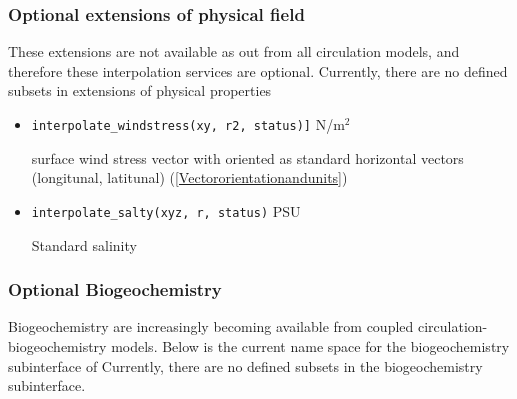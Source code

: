 \subsubsection{Optional extensions of physical field }   
 
These extensions are not available as out from all circulation models, and therefore
these interpolation services are optional. Currently, there are no defined subsets in extensions
of physical properties

\begin{itemize}    

  \item {\tt interpolate\_windstress(xy, r2, status)]} N/m$^2$ \newline

    surface wind stress vector with oriented as standard horizontal vectors (longitunal, latitunal) (\ref{Vectororientationandunits}) 
 
  \item {\tt interpolate\_salty(xyz, r, status)} PSU   \newline  

    Standard salinity

\end{itemize}
\subsubsection{Optional Biogeochemistry }  

Biogeochemistry are increasingly becoming available from coupled circulation-biogeochemistry models.
Below is the current name space for the biogeochemistry subinterface of 
Currently, there are no defined subsets in the biogeochemistry subinterface.

